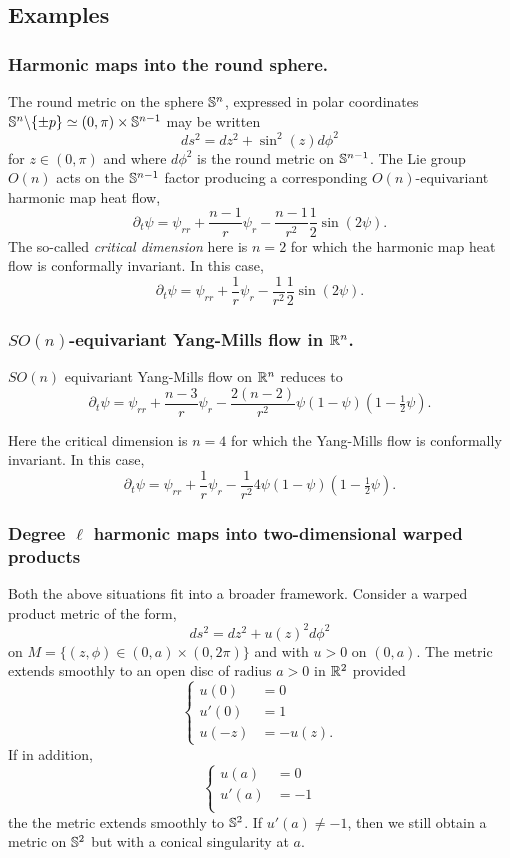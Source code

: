 \documentclass{amsart}
\begin{document}
\subsection{Examples}

\subsubsection*{Harmonic maps into the round sphere.}

The round metric on the sphere \(\S^n\), expressed in polar coordinates \(\S^n \backslash \{\pm p\} \simeq (0, \pi) \times \S^{n-1}\) may be written
\[
ds^2 = dz^2 + \sin^2(z) d\phi^2
\]
for \(z \in (0, \pi)\) and where \(d\phi^2\) is the round metric on \(\S^{n-1}\). The Lie group \(O(n)\) acts on the \(\S^{n-1}\) factor producing a corresponding \(O(n)\)-equivariant harmonic map heat flow,
\[
\partial_t \psi = \psi_{rr} + \frac{n-1}{r} \psi_r - \frac{n-1}{r^2} \frac{1}{2} \sin (2\psi).
\]
The so-called \emph{critical dimension} here is \(n=2\) for which the harmonic map heat flow is conformally invariant. In this case,
\[
\partial_t \psi = \psi_{rr} + \frac{1}{r} \psi_r - \frac{1}{r^2} \frac{1}{2} \sin (2\psi).
\]

\subsubsection*{\(SO(n)\)-equivariant Yang-Mills flow in \(\R^n\).}

\(SO(n)\) equivariant Yang-Mills flow on \(\R^n\) reduces to
\[
\partial_t \psi = \psi_{rr} + \frac{n-3}{r} \psi_r - \frac{2(n-2)}{r^2} \psi(1 - \psi)(1 - \tfrac{1}{2} \psi).
\]

Here the critical dimension is \(n=4\) for which the Yang-Mills flow is conformally invariant. In this case,
\[
\partial_t \psi = \psi_{rr} + \frac{1}{r} \psi_r - \frac{1}{r^2} 4 \psi(1 - \psi)(1 - \tfrac{1}{2} \psi).
\]

\subsubsection*{Degree \(\ell\) harmonic maps into two-dimensional warped products}

Both the above situations fit into a broader framework. Consider a warped product metric of the form,
\[
ds^2 = dz^2 + u(z)^2 d\phi^2
\]
on $M = \{(z,\phi) \in (0, a) \times (0, 2\pi)\}$ and with \(u > 0\) on \((0, a)\). The metric extends smoothly to an open disc of radius $a > 0$ in $\R^2$ provided
\[
\begin{cases}
u(0) &= 0 \\
u'(0) &= 1 \\
u(-z) &= - u(z).
\end{cases}
\]
If in addition,
\[
\begin{cases}
u(a) &= 0 \\
u'(a) &= -1 \\
\end{cases}
\]
the the metric extends smoothly to $\S^2$. If $u'(a) \ne -1$, then we still obtain a metric on $\S^2$ but with a conical singularity at $a$.
\end{document}
